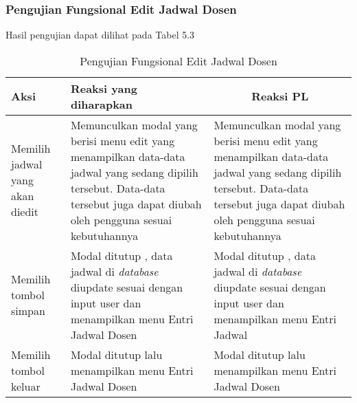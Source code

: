 \subsubsection{Pengujian Fungsional Edit Jadwal Dosen}
Hasil pengujian dapat dilihat pada Tabel 5.3
\begin{center}
	\begin{table}[H]
		\begin{tabular}{|p{5cm}|p{5cm}|p{5cm}|}
		\hline
		\centering Aksi	& 	\centering Reaksi yang diharapkan &  \multicolumn{1}{c|}{Reaksi PL} \\
		\hline
		Memilih jadwal yang akan diedit & Memunculkan modal yang berisi menu edit yang menampilkan data-data jadwal yang sedang dipilih tersebut. Data-data tersebut juga dapat diubah oleh pengguna sesuai kebutuhannya & Memunculkan modal yang berisi menu edit yang menampilkan data-data jadwal yang sedang dipilih tersebut. Data-data tersebut juga dapat diubah oleh pengguna sesuai kebutuhannya \\
		\hline
		Memilih tombol simpan & Modal ditutup , data jadwal di \textit{database} diupdate sesuai dengan input user dan menampilkan menu Entri Jadwal Dosen & Modal ditutup , data jadwal di \textit{database} diupdate sesuai dengan input user dan menampilkan menu Entri Jadwal \\
		\hline
		Memilih tombol keluar & Modal ditutup lalu menampilkan menu Entri Jadwal Dosen & Modal ditutup lalu menampilkan menu Entri Jadwal Dosen \\
		\hline
		\end{tabular}
		\caption{Pengujian Fungsional Edit Jadwal Dosen}
	\end{table}
\end{center}

